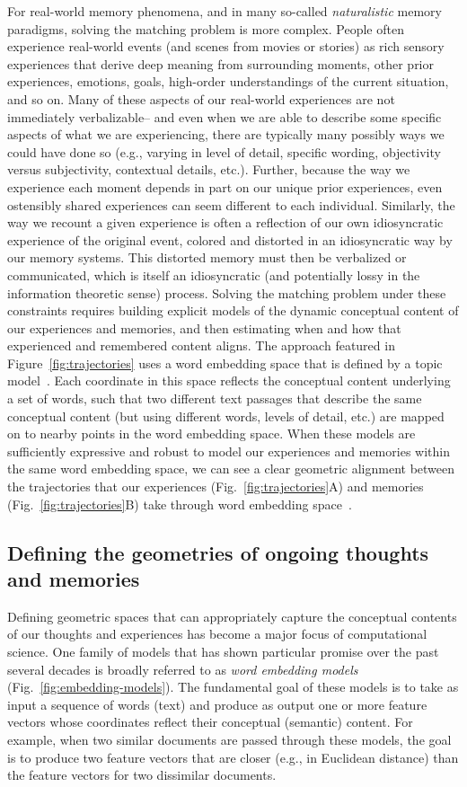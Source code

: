 \documentclass{article}
\begin{document}
For real-world memory phenomena, and in many so-called \textit{naturalistic} memory paradigms, solving the matching problem is more complex.  People often experience real-world events (and scenes from movies or stories) as rich sensory experiences that derive deep meaning from surrounding moments, other prior experiences, emotions, goals, high-order understandings of the current situation, and so on.  Many of these aspects of our real-world experiences are not immediately verbalizable-- and even when we are able to describe some specific aspects of what we are experiencing, there are typically many possibly ways we could have done so (e.g., varying in level of detail, specific wording, objectivity versus subjectivity, contextual details, etc.).  Further, because the way we experience each moment depends in part on our unique prior experiences, even ostensibly shared experiences can seem different to each individual.  Similarly, the way we recount a given experience is often a reflection of our own idiosyncratic experience of the original event, colored and distorted in an idiosyncratic way by our memory systems.  This distorted memory must then be verbalized or communicated, which is itself an idiosyncratic (and potentially lossy in the information theoretic sense) process.  Solving the matching problem under these constraints requires building explicit models of the dynamic conceptual content of our experiences and memories, and then estimating when and how that experienced and remembered content aligns.  The approach featured in Figure~\ref{fig:trajectories} uses a word embedding space that is defined by a topic model~\citep{BleiEtal03}.  Each coordinate in this space reflects the conceptual content underlying a set of words, such that two different text passages that describe the same conceptual content (but using different words, levels of detail, etc.) are mapped on to nearby points in the word embedding space.  When these models are sufficiently expressive and robust to model our experiences and memories within the same word embedding space, we can see a clear geometric alignment between the trajectories that our experiences (Fig.~\ref{fig:trajectories}A) and memories (Fig.~\ref{fig:trajectories}B) take through word embedding space~\citep[also see][]{HeusEtal18c}.

\subsection*{Defining the geometries of ongoing thoughts and memories}
Defining geometric spaces that can appropriately capture the conceptual contents of our thoughts and experiences has become a major focus of computational science.  One family of models that has shown particular promise over the past several decades is broadly referred to as \textit{word embedding models} (Fig.~\ref{fig:embedding-models}).  The fundamental goal of these models is to take as input a sequence of words (text) and produce as output one or more feature vectors whose coordinates reflect their conceptual (semantic) content.  For example, when two similar documents are passed through these models, the goal is to produce two feature vectors that are closer (e.g., in Euclidean distance) than the feature vectors for two dissimilar documents.
\end{document}
